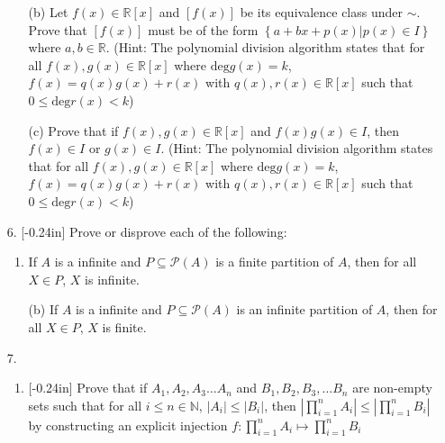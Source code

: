 \documentclass[letterpaper,12pt]{article}
\newcommand{\set}[1]{\left\{ #1 \right\}}
\theoremstyle{definition}
\begin{document}
\pagebreak
\begin{enumerate}
    \item[] \begin{enumerate}
        \item[(b)] Let $f(x) \in \mathbb{R}[x]$ and $[f(x)]$ be its equivalence class under $\sim$. Prove that $[f(x)]$ must be of the form $\set{a + bx + p(x) | p(x) \in I}$ where $a,b \in \mathbb{R}$. (Hint: The polynomial division algorithm states that for all $f(x),g(x) \in \mathbb{R}[x]$ where $\mathrm{deg}g(x) = k$, $f(x)=q(x)g(x)+r(x)$ with $q(x),r(x) \in \mathbb{R}[x]$ such that $0 \leq \mathrm{deg}r(x) < k$)
    \end{enumerate}
\end{enumerate}
\pagebreak
\begin{enumerate}
    \item[] \begin{enumerate}
        \item[(c)] Prove that if $f(x),g(x) \in \mathbb{R}[x]$ and $f(x)g(x) \in I$, then $f(x) \in I$ or $g(x) \in I$. (Hint: The polynomial division algorithm states that for all $f(x),g(x) \in \mathbb{R}[x]$ where $\mathrm{deg}g(x) = k$, $f(x)=q(x)g(x)+r(x)$ with $q(x),r(x) \in \mathbb{R}[x]$ such that $0 \leq \mathrm{deg}r(x) < k$)
    \end{enumerate}
\end{enumerate}
\pagebreak
\begin{enumerate}
    \item[6.] \reversemarginpar{}[-0.24in] Prove or disprove each of the following: \begin{enumerate}
        \item If $A$ is a infinite and $P \subseteq \mathcal{P}(A)$ is a finite partition of $A$, then for all $X \in P$, $X$ is infinite.
    \end{enumerate}
\end{enumerate}
\pagebreak
\begin{enumerate}
    \item[] \begin{enumerate}
        \item[(b)] If $A$ is a infinite and $P \subseteq \mathcal{P}(A)$ is an infinite partition of $A$, then for all $X \in P$, $X$ is finite.
    \end{enumerate}
\end{enumerate}
\pagebreak
\begin{enumerate}
    \item[7.] \begin{enumerate}
        \item \reversemarginpar{}[-0.24in] Prove that if $A_1,A_2,A_3 \ldots A_n$ and $B_1,B_2,B_3,\ldots B_n$ are non-empty sets such that for all $i \leq n \in \mathbb{N}$, $|A_i| \leq |B_i|$, then $|\prod_{i = 1}^n A_i |\leq |\prod_{i = 1}^n B_i |$ by constructing an explicit injection $f: \prod_{i = 1}^n A_i  \mapsto \prod_{i = 1}^n B_i $
    \end{enumerate}
\end{enumerate}
\end{document}
